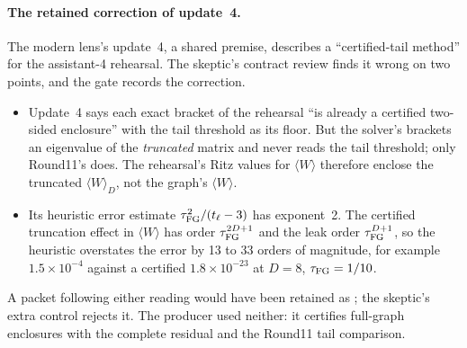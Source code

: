\paragraph{The retained correction of update~4.}
The modern lens's update~4, a shared premise, describes a
``certified-tail method'' for the assistant-4 rehearsal. The skeptic's
contract review finds it wrong on two points, and the gate records the
correction.
\begin{itemize}
\item Update~4 says each exact bracket of the rehearsal ``is already a
 certified two-sided enclosure'' with the tail threshold as its floor. But
 the solver's  brackets an eigenvalue of the
 \emph{truncated} matrix and never reads the tail threshold; only Round11's
  does. The rehearsal's Ritz values for
 $\langle W\rangle$ therefore enclose the truncated $\langle W\rangle_D$, not
 the graph's $\langle W\rangle$.
\item Its heuristic error estimate $\tau_{\mathrm{FG}}^2/(t_\ell-3)$ has exponent~2. The
 certified truncation effect in $\langle W\rangle$ has order $\tau_{\mathrm{FG}}^{2D+1}$ and
 the leak order $\tau_{\mathrm{FG}}^{D+1}$, so the heuristic overstates the error by 13 to
 33 orders of magnitude, for example $1.5\times10^{-4}$ against a certified
 $1.8\times10^{-23}$ at $D=8$, $\tau_{\mathrm{FG}}=1/10$.
\end{itemize}
A packet following either reading would have been retained as
; the skeptic's extra control
 rejects it. The producer used
neither: it certifies full-graph enclosures with the complete residual and
the Round11 tail comparison.

